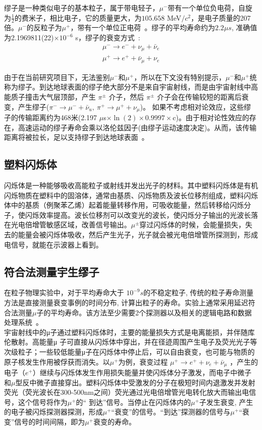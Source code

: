 \documentclass[aps,prd,superscriptaddress,nofootinbib,preprint]{ctexart}
\begin{document}
\begin{CJK}{UTF8}{gbsn}
缪子是一种类似电子的基本粒子，属于带电轻子，$\mu^-$带有一个单位负电荷，自旋为$\frac{1}{2}$的费米子，相比电子，它的质量更大，为$105. 658$ MeV$/c^2$，是电子质量的207 倍。$\mu^-$的反粒子为$\mu^+$，带有一个单位正电荷~\cite{3}。缪子的平均寿命约为$2.2\mu s$, 准确值为2.1969811(22)$\times10^{-6}$ s，缪子的衰变方式~\cite{4}:
\begin{align}
\mu^- \rightarrow e^- + \nu_\mu + \bar\nu_e\\
\mu^+ \rightarrow e^+ + \bar\nu_\mu + \nu_e
\end{align}

由于在当前研究项目下，无法鉴别$\mu^-$和$\mu^+$，所以在下文没有特别提示，$\mu^-$和$\mu^+$统称为缪子。到达地球表面的缪子绝大部分不是来自宇宙射线，而是由宇宙射线中高能质子撞击大气层顶部，产生 $\pi^\pm$ 介子，然后 $\pi^\pm$ 介子会在传输较短的距离后衰变，产生缪子($\pi^- \rightarrow \mu^- + \bar\nu_u ,\ \pi^+\rightarrow \mu^+ + \nu_\mu$)。 如果不考虑相对论效应，这些缪子的传输距离约为468米(2.197 $\mu$s$\times \ln(2) \times 0.9997\times$c)。由于相对论性效应的存在，高速运动的缪子寿命会乘以洛伦兹因子(由缪子运动速度决定)。从而，该传输距离将被拉长，足以支持缪子到达地球表面~\cite{3}。

\subsection{塑料闪烁体}

闪烁体是一种能够吸收高能粒子或射线并发出光子的材料。其中塑料闪烁体是有机闪烁物质在塑料中的固溶体，通常由基质、闪烁物质及波长位移剂组成，塑料闪烁体中的基质（例聚苯乙烯）起着能量转移作用，可吸收能量，然后转移给闪烁分子，使闪烁效率提高。波长位移剂可以改变光的波长，使闪烁分子输出的光波长落在光电倍增管敏感区域，改善信号输出。$\mu^\pm$穿过闪烁体的时候，会能量损失，失去的能量会被闪烁体吸收，然后产生光子，光子就会被光电倍增管所探测到，形成电信号，就能在示波器上看到。

\subsection{符合法测量宇生缪子}

在粒子物理实验中，对于平均寿命大于 $10^{-9}s$的不稳定粒子, 传统的粒子寿命测量方法是直接测量衰变事例的时间分布, 计算出粒子的寿命。实验上通常采用延迟符合法测量$\mu$子的平均寿命。该方法至少需要2个探测器以及相关的逻辑电路和数据处理系统~\cite{5}。\\
宇宙射线中的μ子通过塑料闪烁体时，主要的能量损失方式是电离能损，并伴随库伦散射。高能量μ 子可直接从闪烁体中穿出，并在径迹周围产生电子及荧光光子等次级粒子；一些较低能量μ子在闪烁体中停止后，可以自由衰变，也可能与物质的原子核发生作用被俘获而消失。以$\mu^+$为例，衰变过程
$\mu^+ \to e^+ + \nu_e + \bar{\nu}_{\mu}$
，产生的电子（$e^+$）继续与闪烁体发生作用损失能量并使闪烁体分子激发，而电子中微子和$\mu$型反中微子直接穿出。塑料闪烁体中受激发的分子在极短时间内退激发并发射荧光（荧光波长在300-500nm之间）荧光通过光电倍增管光电转化放大而输出电信号，这个信号将作为$\mu^+$的`` 到达''信号。当停止在闪烁体内的$\mu^+$子发生衰变, 产生的电子被闪烁探测器探测，形成$\mu^+$“衰变”的信号。“到达”探测器的信号与$\mu^+$“衰变”信号的时间间隔，即为$\mu^+$衰变的寿命。


\end{CJK}
\end{document}
